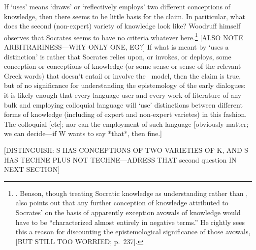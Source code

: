 \documentclass[11pt,letterpaper,oneside]{amsart} %
\begin{document}
If `uses' means `draws' or `reflectively employs' two different conceptions of knowledge, then there seems to be little basis for the claim. In pariticular, what does the second (\ie non-expert) variety of knowledge look like? Woodruff himself observes that Socrates seems to have no criteria whatever here.\footnote{\citet[p.\ 77]{woodruff1990pse}. Benson, though treating Socratic knowledge as understanding rather than \techne, also points out that any further conception of knowledge attributed to Socrates' on the basis of apparently exception avowals of knowledge would have to be ``characterized almost entirely in negative terms.'' He rightly sees this a reason for discounting the epistemological significance of those avowals, [BUT STILL TOO WORRIED; p.\ 237].} [ALSO NOTE ARBITRARINESS---WHY ONLY ONE, EG?] If what is meant by `uses a distinction' is rather that Socrates relies upon, or invokes, or deploys, some conception or conceptions of knowledge (or some sense or sense of the relevant Greek words) that doesn't entail or involve the \techne\ model, then the claim is true, but of no significance for understanding the epistemology of the early dialogues: it is likely enough that every language user and every work of literature of any bulk and employing colloquial language will `use' distinctions between different forms of knowledge (including of expert and non-expert varietes) in this fashion. The colloquial [etc]; nor can the employment of such language [obviously matter; we can decide---if W wants to say *that*, then fine.]




[DISTINGUISH: S HAS CONCEPTIONS OF TWO VARIETIES OF K, AND S HAS TECHNE PLUS NOT TECHNE---ADRESS THAT second question IN NEXT SECTION] 









\end{document}

